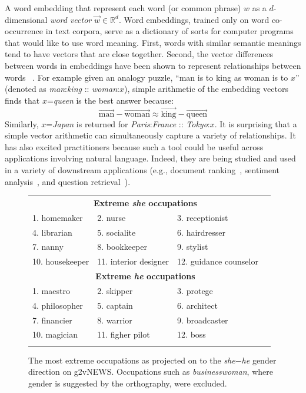 \documentclass{article}
\begin{document}
A word embedding that represent each word (or common phrase) $w$ as a $d$-dimensional {\em word vector} $\vec{w}\in \mathbb{R}^d$. Word embeddings, trained only on word co-occurrence in text corpora, serve as a dictionary of sorts for computer programs that would like to use word meaning. First, words with similar semantic meanings tend to have vectors that are close together. Second, the vector differences between words in embeddings have been shown to represent relationships between words ~\cite{rubenstein1965contextual, mikolov2013linguistic}. For example given an analogy puzzle, ``man is to king as woman is to $x$'' (denoted as \emph{man}:\emph{king} :: \emph{woman}:$x$), simple arithmetic of the embedding vectors finds that $x$=\emph{queen} is the best answer because:
\[
\overrightarrow{\text{man}}-\overrightarrow{\text{woman}}\approx \overrightarrow{\text{king}}-\overrightarrow{\text{queen}}
\]
 Similarly, $x$=\emph{Japan} is returned for \emph{Paris}:\emph{France} ::  
\emph{Tokyo}:$x$. It is surprising that a simple vector arithmetic can simultaneously capture a variety of relationships. It has also excited practitioners because such a tool could be useful across applications involving natural language. Indeed, they are being studied and used in a variety of downstream applications (e.g., document ranking~\cite{NMCC16}, sentiment analysis~\cite{IrsoyCardie14}, and question retrieval~\cite{LJBJTMM16}).  

\begin{figure}
\begin{tabular}{lllc}
\multicolumn{3}{c}{\bf{Extreme \emph{she} occupations}}\\ 
{1. homemaker} & {2. nurse} & {3. receptionist} \\
{4. librarian} & {5. socialite} & {6. hairdresser} \\
{7. nanny} & {8. bookkeeper} & {9. stylist} \\
{10. housekeeper} & {11. interior designer} & {12. guidance counselor} \\[2ex]
\multicolumn{3}{c}{{\bf Extreme \emph{he} occupations}}\\
{1. maestro} & {2. skipper} & {3. protege} \\
{4. philosopher} & {5. captain} & {6. architect} \\
{7. financier} & {8. warrior} & {9. broadcaster} \\
{10. magician} & {11. figher pilot} & {12. boss} \\
\\\end{tabular}
\caption{\label{fig:occupation_words} The most extreme occupations as projected on to the {\em she$-$he} gender direction on g2vNEWS. Occupations such as {\em businesswoman}, where gender is suggested by the orthography, were excluded.}
\end{figure}
\end{document}
